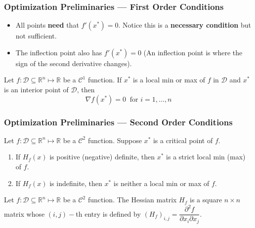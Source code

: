 \documentclass[11pt,xcolor={svgnames},aspectratio=169,usepdftitle=false,notheorems]{beamer}
\begin{document}
\begin{frame}
  \frametitle{Optimization Preliminaries --- First Order Conditions}
\begin{itemize}
  \item All points \alert{\textbf{need}} that $f'(x^*) = 0$. Notice this is a \alert{\textbf{necessary condition}} but not sufficient.
  \item The inflection point also has $f'(x^*) = 0$ {\tiny (An inflection point is where the sign of the second derivative changes)}.
\end{itemize}

\begin{theorem}
Let $f : \mathcal{D}\subseteq\mathbb{R}^n \mapsto \mathbb{R}$ be a $\mathcal{C}^1$ function. If $x^*$ is a local min or max of $f$ in $\mathcal{D}$ and $x^*$ is an interior point of $\mathcal{D}$, then
\[
\nabla f(x^*) = 0 \ \text{ for } i = 1,\ldots, n
\]
\end{theorem}
\end{frame}

\begin{frame}
  \frametitle{Optimization Preliminaries --- Second Order Conditions}
\begin{theorem}
Let $f : \mathcal{D}\subseteq\mathbb{R}^n \mapsto \mathbb{R}$ be a $\mathcal{C}^2$ function. Suppose $x^*$ is a critical point of $f$.
\begin{enumerate}
  \item If $H_f(x)$ is positive (negative) definite, then $x^*$ is a strict local min (max) of $f$.
  \item If $H_f(x)$ is indefinite, then $x^*$ is neither a local min or max of $f$.
\end{enumerate}
\end{theorem}

\begin{definition}
Let $f : \mathcal{D}\subseteq\mathbb{R}^n \mapsto \mathbb{R}$ be a $\mathcal{C}^2$ function. The Hessian matrix $H_f$ is a square $n\times n$ matrix whose $(i,j)-$th entry is defined by $(H_f)_{i,j} = \dfrac{\partial^2 f}{\partial x_i \partial x_j}$.
\end{definition}
\end{frame}
\end{document}
